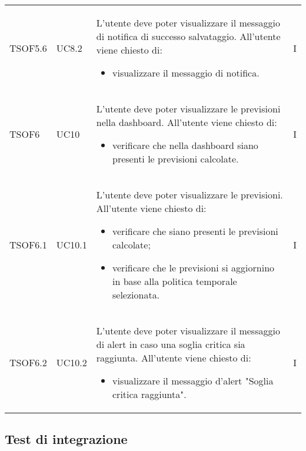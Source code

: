\begin{longtable}{C{2.5cm} C{2.5cm} L{8cm} C{2cm}}
TSOF5.6 &
UC8.2 &
L'utente deve poter visualizzare il messaggio di notifica di successo salvataggio. All'utente viene chiesto di:
\begin{itemize}
	\item visualizzare il messaggio di notifica.
\end{itemize}&
I \\

TSOF6 &
UC10 &
L'utente deve poter visualizzare le previsioni nella dashboard. All'utente viene chiesto di:
\begin{itemize}
	\item verificare che nella dashboard siano presenti le previsioni calcolate.
\end{itemize}&
I \\

TSOF6.1 &
UC10.1 &
L'utente deve poter visualizzare le previsioni. All'utente viene chiesto di:
\begin{itemize}
	\item verificare che siano presenti le previsioni calcolate;
	\item verificare che le previsioni si aggiornino in base alla politica temporale selezionata.
\end{itemize}&
I \\

TSOF6.2 &
UC10.2 &
L'utente deve poter visualizzare il messaggio di alert in caso una soglia critica sia raggiunta. All'utente viene chiesto di:
\begin{itemize}
	\item visualizzare il messaggio d'alert "Soglia critica raggiunta".
\end{itemize}&
I \\

\end{longtable}
\pagebreak
\subsection{Test di integrazione}

